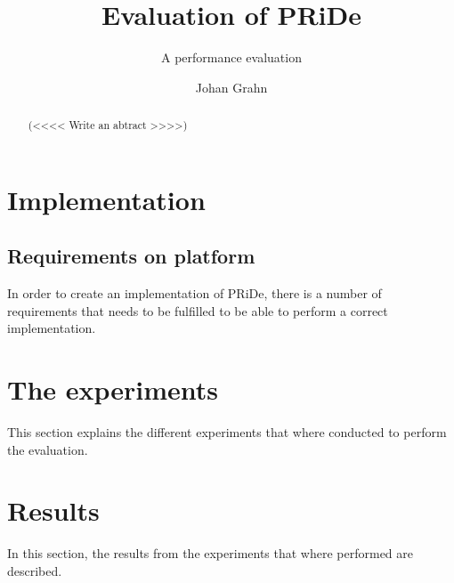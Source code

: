 \documentclass[MSc, ida]{histhesis}
\title{Evaluation of PRiDe}
\subtitle{A performance evaluation}
\author{Johan Grahn}
\begin{document}
\maketitle
\begin{abstract}

(<<<< Write an abtract >>>>)

\end{abstract}
\tableofcontents
\thispagestyle{plain}
\listoffigures
\newpage

\newpage

\newpage

\newpage

\newpage

\newpage

\newpage

\section{Implementation} %
\label{sec:implementation}




\subsection{Requirements on platform} %
\label{sub:s}

In order to create an implementation of PRiDe, there is a number of requirements that needs to be fulfilled to be able to perform a correct implementation.




\section{The experiments} %
\label{sec:the_experiments}

This section explains the different experiments that where conducted to perform the evaluation. 

\section{Results} %
\label{sec:results}

In this section, the results from the experiments that where performed are described. 
\end{document}
